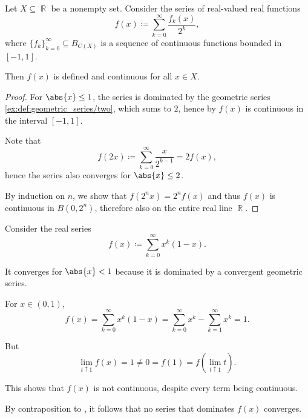 \begin{corollary}\label{thm:continuous_function_series_powers_of_two}
  Let \( X \subseteq \BbbR \) be a nonempty set. Consider the series of real-valued real functions
  \begin{equation}\label{thm:continuous_function_series_powers_of_two/series}
    f(x) \coloneqq \sum_{k=0}^\infty \frac {f_k(x)} {2^k},
  \end{equation}
  where \( \{ f_k \}_{k=0}^\infty \subseteq B_{C(X)} \) is a sequence of continuous functions bounded in \( [-1, 1] \).

  Then \( f(x) \) is defined and continuous for all \( x \in X \).
\end{corollary}
\begin{proof}
  For \( \abs{x} \leq 1 \), the series is dominated by the geometric series \eqref{ex:def:geometric_series/two}, which sums to \( 2 \), hence by  \( f(x) \) is continuous in the interval \( [-1, 1] \).

  Note that
  \begin{equation*}
    f(2x) \coloneqq \sum_{k=0}^\infty \frac x {2^{k-1}} = 2 f(x),
  \end{equation*}
  hence the series  also converges for \( \abs{x} \leq 2 \).

  By induction on \( n \), we show that \( f(2^n x) = 2^n f(x) \) and thus \( f(x) \) is continuous in \( B(0, 2^n) \), therefore also on the entire real line \( \BbbR \).
\end{proof}

\begin{example}\label{thm:weierstrass_series_criterion/counterexample}
  Consider the real series
  \begin{equation*}
    f(x) \coloneqq \sum_{k=0}^\infty x^k (1 - x).
  \end{equation*}

  It converges for \( \abs{x} < 1 \) because it is dominated by a convergent geometric series.

  For \( x \in (0, 1) \),
  \begin{equation*}
    f(x)
    =
    \sum_{k=0}^\infty x^k (1 - x)
    =
    \sum_{k=0}^\infty x^k - \sum_{k=1}^\infty x^k
    =
    1.
  \end{equation*}

  But
  \begin{equation*}
    \lim_{t \uparrow 1} f(x) = 1 \neq 0 = f(1) = f(\lim_{t \uparrow 1} t).
  \end{equation*}

  This shows that \( f(x) \) is not continuous, despite every term being continuous.

  By contraposition to , it follows that no series that dominates \( f(x) \) converges.
\end{example}

